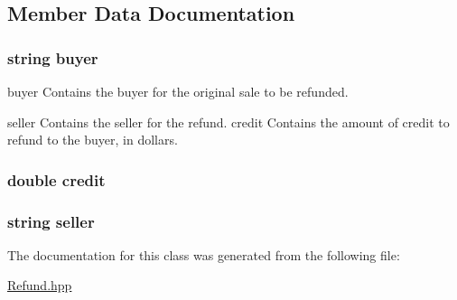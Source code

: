 \subsection{Member Data Documentation}
\hypertarget{class_refund_a6b1f8b7205b4bb4f3dfa0cba13c39bac}{
\subsubsection[{buyer}]{\setlength{\rightskip}{0pt plus 5cm}string buyer\hspace{0.3cm}{\ttfamily [private]}}}\label{class_refund_a6b1f8b7205b4bb4f3dfa0cba13c39bac}


buyer Contains the buyer for the original sale to be refunded. 

seller Contains the seller for the refund. credit Contains the amount of credit to refund to the buyer, in dollars. \hypertarget{class_refund_aa559c3686bb9d38c3335c16bbea07be8}{
\subsubsection[{credit}]{\setlength{\rightskip}{0pt plus 5cm}double credit\hspace{0.3cm}{\ttfamily [private]}}}\label{class_refund_aa559c3686bb9d38c3335c16bbea07be8}
\hypertarget{class_refund_a8cdc0977faad029fbb45ab09035319b9}{
\subsubsection[{seller}]{\setlength{\rightskip}{0pt plus 5cm}string seller\hspace{0.3cm}{\ttfamily [private]}}}\label{class_refund_a8cdc0977faad029fbb45ab09035319b9}


The documentation for this class was generated from the following file\-:\begin{DoxyCompactItemize}
\item 
\hyperlink{_refund_8hpp}{Refund.\-hpp}\end{DoxyCompactItemize}
